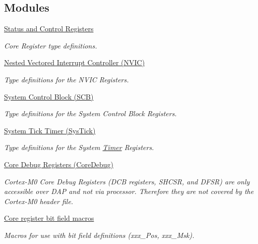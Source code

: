 \subsection*{Modules}
\begin{DoxyCompactItemize}
\item 
\hyperlink{group___c_m_s_i_s___c_o_r_e}{Status and Control Registers}
\begin{DoxyCompactList}\small\item\em Core Register type definitions. \end{DoxyCompactList}\item 
\hyperlink{group___c_m_s_i_s___n_v_i_c}{Nested Vectored Interrupt Controller (\+N\+V\+I\+C)}
\begin{DoxyCompactList}\small\item\em Type definitions for the N\+V\+IC Registers. \end{DoxyCompactList}\item 
\hyperlink{group___c_m_s_i_s___s_c_b}{System Control Block (\+S\+C\+B)}
\begin{DoxyCompactList}\small\item\em Type definitions for the System Control Block Registers. \end{DoxyCompactList}\item 
\hyperlink{group___c_m_s_i_s___sys_tick}{System Tick Timer (\+Sys\+Tick)}
\begin{DoxyCompactList}\small\item\em Type definitions for the System \hyperlink{class_timer}{Timer} Registers. \end{DoxyCompactList}\item 
\hyperlink{group___c_m_s_i_s___core_debug}{Core Debug Registers (\+Core\+Debug)}
\begin{DoxyCompactList}\small\item\em Cortex-\/\+M0 Core Debug Registers (D\+CB registers, S\+H\+C\+SR, and D\+F\+SR) are only accessible over D\+AP and not via processor. Therefore they are not covered by the Cortex-\/\+M0 header file. \end{DoxyCompactList}\item 
\hyperlink{group___c_m_s_i_s__core__bitfield}{Core register bit field macros}
\begin{DoxyCompactList}\small\item\em Macros for use with bit field definitions (xxx\+\_\+\+Pos, xxx\+\_\+\+Msk). \end{DoxyCompactList}\item 

\end{DoxyCompactItemize}
